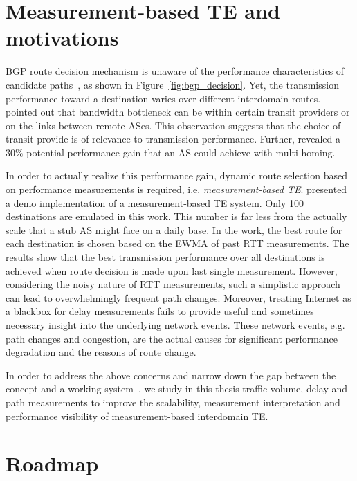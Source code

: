 \section{Measurement-based TE and motivations}
BGP route decision mechanism is unaware of the performance characteristics of candidate paths~\cite{Yannuzzi2005}, as shown in Figure~\ref{fig:bgp_decision}.
Yet, the transmission performance toward a destination varies over different interdomain routes.
\citet{Akella2003} pointed out that bandwidth bottleneck can be within certain transit providers or on the links between remote ASes.
This observation suggests that the choice of transit provide is of relevance to transmission performance.
Further, \citet{Akella2003a} revealed a $30\%$ potential performance gain that an AS could achieve with multi-homing.

In order to actually realize this performance gain, dynamic route selection based on performance measurements is required, i.e. \textit{measurement-based TE}.
\citet{Akella2008} presented a demo implementation of a measurement-based TE system.
Only 100 destinations are emulated in this work.
This number is far less from the actually scale that a stub AS might face on a daily base. 
In the work, the best route for each destination is chosen based on the \ac{EWMA} of past \acf{RTT} measurements. 
The results show that the best transmission performance over all destinations is achieved when route decision is made upon last single measurement.
However, considering the noisy nature of \ac{RTT} measurements, such a simplistic approach can lead to overwhelmingly frequent path changes. 
Moreover, treating Internet as a blackbox for delay measurements fails to provide useful and sometimes necessary insight into the underlying network events.
These network events, e.g. path changes and congestion, are the actual causes for significant performance degradation and the reasons of route change.

In order to address the above concerns and narrow down the gap between the concept and a working system~\cite{b6}, 
we study in this thesis traffic volume, delay and path measurements to improve the scalability, measurement interpretation and performance visibility of measurement-based interdomain TE.


\section{Roadmap}

